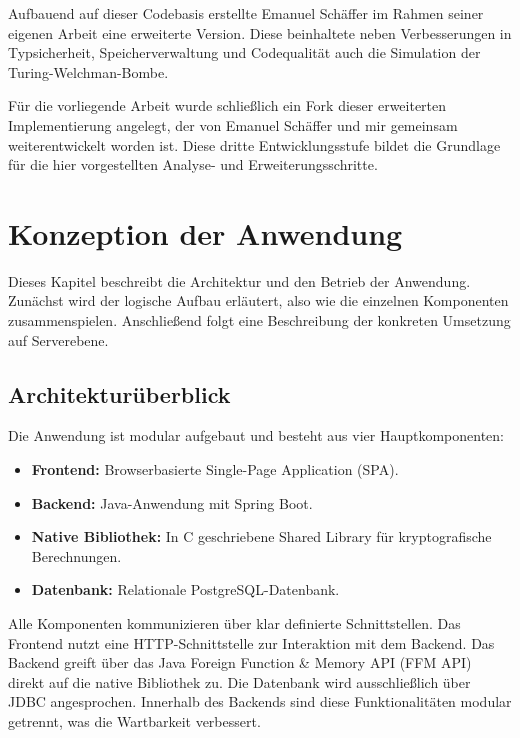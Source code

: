 \documentclass[12pt, ngerman, a4paper, numbers=noenddot]{article}
\begin{document}
Aufbauend auf dieser Codebasis erstellte Emanuel Schäffer im Rahmen seiner eigenen Arbeit eine erweiterte Version. Diese beinhaltete neben Verbesserungen in Typsicherheit, Speicherverwaltung und Codequalität auch die Simulation der Turing-Welchman-Bombe\autocite{schaffer2025enigma}.

Für die vorliegende Arbeit wurde schließlich ein Fork dieser erweiterten Implementierung angelegt, der von Emanuel Schäffer und mir gemeinsam weiterentwickelt worden ist\autocite{schaffer2025enigmaserver}. Diese dritte Entwicklungsstufe bildet die Grundlage für die hier vorgestellten Analyse- und Erweiterungsschritte.



\newpage
\section{Konzeption der Anwendung}

Dieses Kapitel beschreibt die Architektur und den Betrieb der Anwendung. Zunächst wird der logische Aufbau erläutert, also wie die einzelnen Komponenten zusammenspielen. Anschließend folgt eine Beschreibung der konkreten Umsetzung auf Serverebene.

\subsection{Architekturüberblick}

Die Anwendung ist modular aufgebaut und besteht aus vier Hauptkomponenten:

\begin{itemize}
	\item \textbf{Frontend:} Browserbasierte Single-Page Application (SPA).
	\item \textbf{Backend:} Java-Anwendung mit Spring Boot.
	\item \textbf{Native Bibliothek:} In C geschriebene Shared Library für kryptografische Berechnungen.
	\item \textbf{Datenbank:} Relationale PostgreSQL-Datenbank.
\end{itemize}

Alle Komponenten kommunizieren über klar definierte Schnittstellen. Das Frontend nutzt eine HTTP-Schnittstelle zur Interaktion mit dem Backend. Das Backend greift über das Java Foreign Function \& Memory API (FFM API) direkt auf die native Bibliothek zu. Die Datenbank wird ausschließlich über JDBC angesprochen. Innerhalb des Backends sind diese Funktionalitäten modular getrennt, was die Wartbarkeit verbessert.
\end{document}
